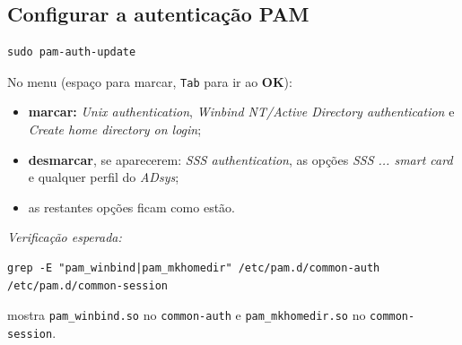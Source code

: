 
\subsection[Configurar a autenticação PAM]{Configurar a autenticação PAM}


\begin{lstlisting}[style=bashstyle]
sudo pam-auth-update
\end{lstlisting}

No menu (espaço para marcar, \texttt{Tab} para ir ao \textbf{OK}):

\begin{itemize}
\item \textbf{marcar:} \emph{Unix authentication}, \emph{Winbind NT/Active Directory authentication} e \emph{Create home directory on login};
\item \textbf{desmarcar}, se aparecerem: \emph{SSS authentication}, as opções \emph{SSS ... smart card} e qualquer perfil do \emph{ADsys};
\item as restantes opções ficam como estão.
\end{itemize}

\emph{Verificação esperada:}

\begin{lstlisting}[style=bashstyle]
grep -E "pam_winbind|pam_mkhomedir" /etc/pam.d/common-auth /etc/pam.d/common-session
\end{lstlisting}

mostra \texttt{pam\_winbind.so} no \texttt{common-auth} e \texttt{pam\_mkhomedir.so} no \texttt{common-session}.

